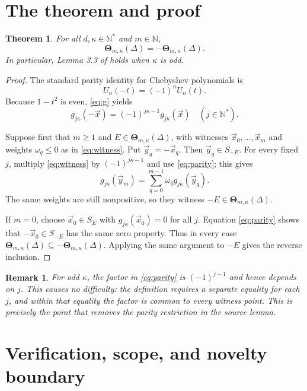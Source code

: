 \documentclass[10pt]{article}
\newtheorem{theorem}{Theorem}
\newtheorem{remark}{Remark}
\newcommand{\ThetaSet}{\boldsymbol{\Theta}}
\newcommand{\N}{\mathbb N}
\begin{document}
\section{The theorem and proof}

\begin{theorem}\label{thm:main}
For all $d,\kappa\in\N^*$ and $m\in\N$,
\[
 \ThetaSet_{m,\kappa}(\Delta)=-\ThetaSet_{m,\kappa}(\Delta).
\]
In particular, Lemma 3.3 of \cite{GM} holds when $\kappa$ is odd.
\end{theorem}

\begin{proof}
The standard parity identity for Chebyshev polynomials is
\[
 U_n(-t)=(-1)^nU_n(t).
\]
Because $1-t^2$ is even, \eqref{eq:g} yields
\begin{equation}\label{eq:parity}
 g_{j\kappa}(-\vec x)
   =(-1)^{j\kappa-1}g_{j\kappa}(\vec x)
 \quad (j\in\N^*).
\end{equation}

Suppose first that $m\geq1$ and $E\in\ThetaSet_{m,\kappa}(\Delta)$, with
witnesses $\vec x_0,\ldots,\vec x_m$ and weights $\omega_q\leq0$ as in
\eqref{eq:witness}.  Put $\vec y_q=-\vec x_q$.  Then $\vec y_q\in S_{-E}$.
For every fixed $j$, multiply \eqref{eq:witness} by
$(-1)^{j\kappa-1}$ and use \eqref{eq:parity}; this gives
\[
 g_{j\kappa}(\vec y_m)
   =\sum_{q=0}^{m-1}\omega_qg_{j\kappa}(\vec y_q).
\]
The same weights are still nonpositive, so they witness
$-E\in\ThetaSet_{m,\kappa}(\Delta)$.

If $m=0$, choose $\vec x_0\in S_E$ with
$g_{j\kappa}(\vec x_0)=0$ for all $j$.  Equation \eqref{eq:parity} shows that
$-\vec x_0\in S_{-E}$ has the same zero property.  Thus in every case
$\ThetaSet_{m,\kappa}(\Delta)\subseteq-\ThetaSet_{m,\kappa}(\Delta)$.
Applying the same argument to $-E$ gives the reverse inclusion.
\end{proof}

\begin{remark}
For odd $\kappa$, the factor in \eqref{eq:parity} is $(-1)^{j-1}$ and hence
depends on $j$.  This causes no difficulty: the definition requires a
separate equality for each $j$, and within that equality the factor is common
to every witness point.  This is precisely the point that removes the parity
restriction in the source lemma.
\end{remark}

\section{Verification, scope, and novelty boundary}
\end{document}
